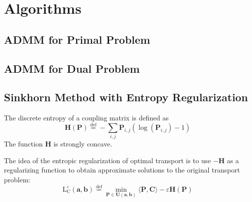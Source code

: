 \documentclass{article}
\begin{document}
\section{Algorithms}
\subsection{ADMM for Primal Problem}
\subsection{ADMM for Dual Problem}
\subsection{Sinkhorn Method with Entropy Regularization}
The discrete entropy of a coupling matrix is defined as
\begin{equation}
\mathbf { H } ( \mathbf { P } ) \stackrel { \mathrm { def } } { = } - \sum _ { i , j } \mathbf { P } _ { i , j } \left( \log \left( \mathbf { P } _ { i , j } \right) - 1 \right)
\end{equation}
The function $\mathbf{H}$ is strongly concave.

The idea of the entropic regularization of optimal transport is to use $-\mathbf{H}$ as a regularizing function to obtain approximate solutions to the original transport problem:
\begin{equation}
\mathrm { L } _ { \mathrm { C } } ^ { \varepsilon } ( \mathbf { a } , \mathbf { b } ) \stackrel { \mathrm { def } } { = } \min _ { \mathbf { P } \in \mathbf { U } ( \mathbf { a } , \mathbf { b } ) } \langle \mathbf { P } , \mathbf { C } \rangle - \varepsilon \mathbf { H } ( \mathbf { P } )
\label{sinkhorn target}
\end{equation}
\end{document}
